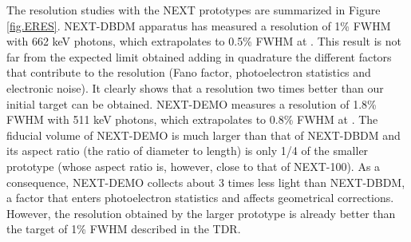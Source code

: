 The resolution studies with the NEXT prototypes are summarized in Figure \ref{fig.ERES}. NEXT-DBDM apparatus has measured a resolution of 1\% FWHM with 
662 keV photons, which extrapolates to 0.5\% FWHM at \Qbb. This result is not far from the expected limit obtained adding in quadrature the different factors that contribute to the resolution (Fano factor, photoelectron statistics and electronic noise). It clearly shows that a resolution two times better than our initial target can be obtained. NEXT-DEMO measures a resolution of 1.8\% FWHM with 
511 keV photons, which extrapolates to 0.8\% FWHM at \Qbb. The fiducial volume of NEXT-DEMO is much larger than that of NEXT-DBDM and its aspect ratio (the ratio of diameter to length) is only 1/4 of the smaller prototype (whose aspect ratio is, however, close to that of NEXT-100). As a consequence, NEXT-DEMO collects about 3 times less light than NEXT-DBDM, a factor that enters photoelectron statistics and affects geometrical corrections. However, the resolution obtained by the larger prototype is already better than the target of 1\% FWHM described in the TDR.